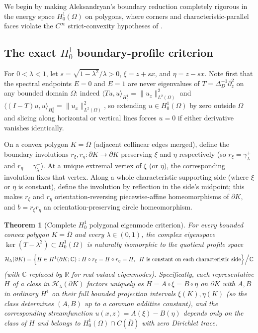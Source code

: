 \documentclass[11pt,reqno]{amsart}
\newtheorem{theorem}{Theorem}[section]
\theoremstyle{definition}
\theoremstyle{remark}
\newcommand{\R}{\mathbb{R}}
\newcommand{\C}{\mathbb{C}}
\begin{document}
We begin by making Aleksandryan's boundary reduction completely rigorous in the energy space $H_0^1(\Omega)$ on polygons, where corners and characteristic-parallel faces violate the $C^\infty$ strict-convexity hypotheses of \cite[\S 4, p.~482]{Aleksandryan1960}.

\subsection{The exact \texorpdfstring{$H_0^1$}{H01} boundary-profile criterion}
For $0 < \lambda < 1$, let $s = \sqrt{1-\lambda^2}/\lambda > 0$, $\xi = z + sx$, and $\eta = z - sx$. Note first that the spectral endpoints $E = 0$ and $E = 1$ are never eigenvalues of $T = \Delta_D^{-1}\partial_z^2$ on any bounded domain $\Omega$: indeed $\langle Tu, u \rangle_{H_0^1} = \|u_z\|_{L^2(\Omega)}^2$ and $\langle (I-T)u, u \rangle_{H_0^1} = \|u_x\|_{L^2(\Omega)}^2$, so extending $u \in H_0^1(\Omega)$ by zero outside $\Omega$ and slicing along horizontal or vertical lines forces $u = 0$ if either derivative vanishes identically.

On a convex polygon $K = \overline{\Omega}$ (adjacent collinear edges merged), define the boundary involutions $r_\xi, r_\eta \colon \partial K \to \partial K$ preserving $\xi$ and $\eta$ respectively (so $r_\xi = \gamma_\lambda^+$ and $r_\eta = \gamma_\lambda^-$). At a unique extremal vertex of $\xi$ (or $\eta$), the corresponding involution fixes that vertex. Along a whole characteristic supporting side (where $\xi$ or $\eta$ is constant), define the involution by reflection in the side's midpoint; this makes $r_\xi$ and $r_\eta$ orientation-reversing piecewise-affine homeomorphisms of $\partial K$, and $b = r_\xi r_\eta$ an orientation-preserving circle homeomorphism.

\begin{theorem}[Complete $H_0^1$ polygonal eigenmode criterion]\label{thm:h1-criterion}
For every bounded convex polygon $K = \overline{\Omega}$ and every $\lambda \in (0,1)$, the complex eigenspace $\ker(T - \lambda^2) \subset H_0^1(\Omega)$ is naturally isomorphic to the quotient profile space
\begin{equation}\label{eq:h1-space}
  \mathcal{H}_\lambda(\partial K) = \Bigl\{ H \in H^1(\partial K; \C) : H \circ r_\xi = H \circ r_\eta = H,\;\; H \text{ is constant on each characteristic side} \Bigr\} \Big/ \C
\end{equation}
(with $\C$ replaced by $\R$ for real-valued eigenmodes). Specifically, each representative $H$ of a class in $\mathcal{H}_\lambda(\partial K)$ factors uniquely as $H = A \circ \xi = B \circ \eta$ on $\partial K$ with $A, B$ in ordinary $H^1$ on their full bounded projection intervals $\xi(K), \eta(K)$ (so the class determines $(A, B)$ up to a common additive constant), and the corresponding streamfunction $u(x,z) = A(\xi) - B(\eta)$ depends only on the class of $H$ and belongs to $H_0^1(\Omega) \cap C(\overline{\Omega})$ with zero Dirichlet trace.
\end{theorem}
\end{document}
